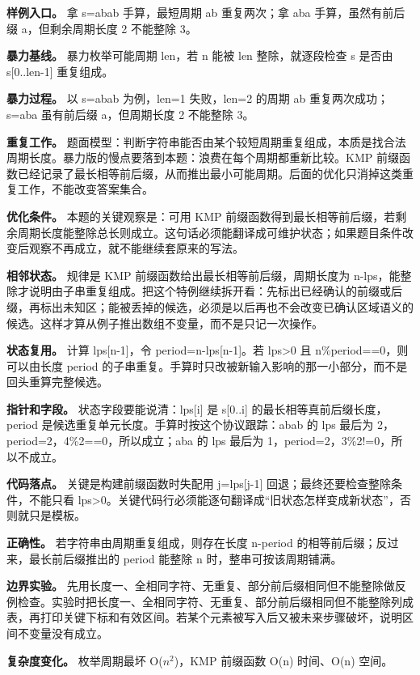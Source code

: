 \textbf{样例入口。} 拿 s=abab 手算，最短周期 ab 重复两次；拿 aba 手算，虽然有前后缀 a，但剩余周期长度 2 不能整除 3。

\textbf{暴力基线。} 暴力枚举可能周期 len，若 n 能被 len 整除，就逐段检查 s 是否由 s[0..len-1] 重复组成。

\textbf{暴力过程。} 以 s=abab 为例，len=1 失败，len=2 的周期 ab 重复两次成功；s=aba 虽有前后缀 a，但周期长度 2 不能整除 3。

\textbf{重复工作。} 题面模型：判断字符串能否由某个较短周期重复组成，本质是找合法周期长度。暴力版的慢点要落到本题：浪费在每个周期都重新比较。KMP 前缀函数已经记录了最长相等前后缀，从而推出最小可能周期。后面的优化只消掉这类重复工作，不能改变答案集合。

\textbf{优化条件。} 本题的关键观察是：可用 KMP 前缀函数得到最长相等前后缀，若剩余周期长度能整除总长则成立。这句话必须能翻译成可维护状态；如果题目条件改变后观察不再成立，就不能继续套原来的写法。

\textbf{相邻状态。} 规律是 KMP 前缀函数给出最长相等前后缀，周期长度为 n-lps，能整除才说明由子串重复组成。把这个特例继续拆开看：先标出已经确认的前缀或后缀，再标出未知区；能被丢掉的候选，必须是以后再也不会改变已确认区域语义的候选。这样才算从例子推出数组不变量，而不是只记一次操作。

\textbf{状态复用。} 计算 lps[n-1]，令 period=n-lps[n-1]。若 lps>0 且 n\%period==0，则可以由长度 period 的子串重复。手算时只改被新输入影响的那一小部分，而不是回头重算完整候选。

\textbf{指针和字段。} 状态字段要能说清：lps[i] 是 s[0..i] 的最长相等真前后缀长度，period 是候选重复单元长度。手算时按这个协议跟踪：abab 的 lps 最后为 2，period=2，4\%2==0，所以成立；aba 的 lps 最后为 1，period=2，3\%2!=0，所以不成立。

\textbf{代码落点。} 关键是构建前缀函数时失配用 j=lps[j-1] 回退；最终还要检查整除条件，不能只看 lps>0。关键代码行必须能逐句翻译成“旧状态怎样变成新状态”，否则就只是模板。

\textbf{正确性。} 若字符串由周期重复组成，则存在长度 n-period 的相等前后缀；反过来，最长前后缀推出的 period 能整除 n 时，整串可按该周期铺满。

\textbf{边界实验。} 先用长度一、全相同字符、无重复、部分前后缀相同但不能整除做反例检查。实验时把长度一、全相同字符、无重复、部分前后缀相同但不能整除列成表，再打印关键下标和有效区间。若某个元素被写入后又被未来步骤破坏，说明区间不变量没有成立。

\textbf{复杂度变化。} 枚举周期最坏 O(\ensuremath{n^{2}})，KMP 前缀函数 O(n) 时间、O(n) 空间。

